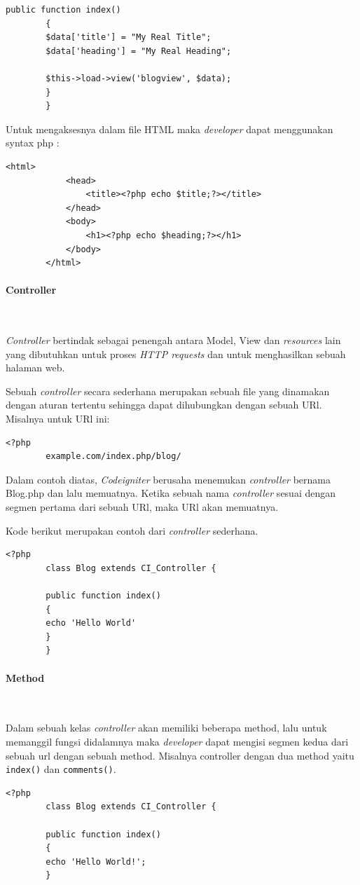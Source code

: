 \documentclass[a4paper,twoside]{article}
\newcommand{\myparagraph}[1]{\paragraph{#1}\mbox{}\\}
\begin{document}
\begin{enumerate}
\begin{lstlisting}[frame=single]
		public function index()
		{
		$data['title'] = "My Real Title";
		$data['heading'] = "My Real Heading";
		
		$this->load->view('blogview', $data);
		}
		}
		\end{lstlisting}
		
		Untuk mengaksesnya dalam file HTML maka \textit{developer} dapat menggunakan syntax php :
		\begin{lstlisting}[frame=single] 
		<html>
			<head>
				<title><?php echo $title;?></title>
			</head>
			<body>
				<h1><?php echo $heading;?></h1>
			</body>
		</html>
		\end{lstlisting}
		
		\myparagraph{Controller} \par
		\textit{Controller} bertindak sebagai penengah antara Model, View dan \textit{resources} lain yang dibutuhkan untuk proses \textit{HTTP requests} dan untuk menghasilkan sebuah halaman web.
		
		Sebuah \textit{controller} secara sederhana merupakan sebuah file yang dinamakan dengan aturan tertentu sehingga dapat dihubungkan dengan sebuah URl.
		Misalnya untuk URl ini:
		\begin{lstlisting}[frame=single] 
		<?php
		example.com/index.php/blog/
		\end{lstlisting}
		
		Dalam contoh diatas, \textit{Codeigniter} berusaha menemukan \textit{controller} bernama Blog.php dan lalu memuatnya. Ketika sebuah nama \textit{controller} sesuai dengan segmen pertama dari sebuah URl, maka URl akan memuatnya.
		
		Kode berikut merupakan contoh dari \textit{controller} sederhana.
		\begin{lstlisting}[frame=single] 
		<?php
		class Blog extends CI_Controller {
		
		public function index()
		{
		echo 'Hello World'
		}
		}
		\end{lstlisting} 
		
		\myparagraph{Method} \par
		Dalam sebuah kelas \textit{controller} akan memiliki beberapa method, lalu untuk memanggil fungsi didalamnya maka \textit{developer} dapat mengisi segmen kedua dari sebuah url dengan sebuah method. Misalnya controller dengan dua method yaitu \texttt{index()} dan \texttt{comments()}.
		\begin{lstlisting}[frame=single] 
		<?php
		class Blog extends CI_Controller {
		
		public function index()
		{
		echo 'Hello World!';
		}
		

\end{lstlisting}
\end{enumerate}
\end{document}
